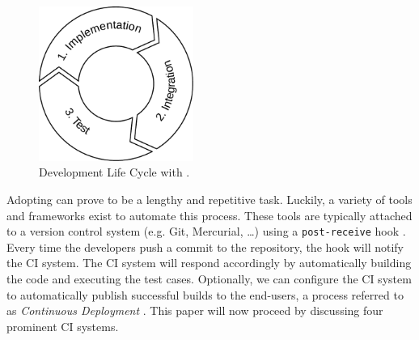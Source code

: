 \begin{figure}[htbp!]
	\centering
	\includegraphics[width=0.45\textwidth]{assets/images/ci-lifecycle.pdf}
	\caption{Development Life Cycle with \CI{}.}
	\label{fig:agile-ci-lifecycle}
\end{figure}

\noindent Adopting \CI{} can prove to be a lengthy and repetitive task. Luckily, a variety of tools and frameworks exist to automate this process. These tools are typically attached to a version control system (e.g. Git, Mercurial, \dots) using a \texttt{post-receive} hook \cite{SmartJenkinsDefinitive}. Every time the developers push a commit to the repository, the hook will notify the CI system. The CI system will respond accordingly by automatically building the code and executing the test cases. Optionally, we can configure the CI system to automatically publish successful builds to the end-users, a process referred to as \emph{Continuous Deployment} \cite{ciusinggitlab}. This paper will now proceed by discussing four prominent CI systems.




